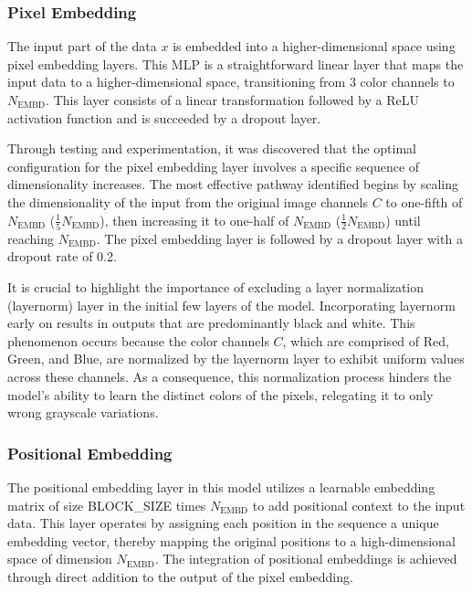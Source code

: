     \subsubsection{Pixel Embedding}

    The input part of the data \(x\) is embedded into a higher-dimensional space using pixel embedding layers. This MLP is a straightforward linear layer that maps the input data to a higher-dimensional space, transitioning from 3 color channels to \(N_{\text{EMBD}}\). This layer consists of a linear transformation followed by a ReLU activation function and is succeeded by a dropout layer.

    Through testing and experimentation, it was discovered that the optimal configuration for the pixel embedding layer involves a specific sequence of dimensionality increases. The most effective pathway identified begins by scaling the dimensionality of the input from the original image channels \(C\) to one-fifth of \(N_{\text{EMBD}}\) (\(\frac{1}{5}N_{\text{EMBD}}\)), then increasing it to one-half of \(N_{\text{EMBD}}\) (\(\frac{1}{2}N_{\text{EMBD}}\)) until reaching \(N_{\text{EMBD}}\). The pixel embedding layer is followed by a dropout layer with a dropout rate of 0.2.

    It is crucial to highlight the importance of excluding a layer normalization (layernorm) layer in the initial few layers of the model. Incorporating layernorm early on results in outputs that are predominantly black and white. This phenomenon occurs because the color channels \(C\), which are comprised of Red, Green, and Blue, are normalized by the layernorm layer to exhibit uniform values across these channels. As a consequence, this normalization process hinders the model's ability to learn the distinct colors of the pixels, relegating it to only wrong grayscale variations.

    \subsubsection{Positional Embedding}

    The positional embedding layer in this model utilizes a learnable embedding matrix of size BLOCK\_SIZE times \(N_{\text{EMBD}}\) to add positional context to the input data. This layer operates by assigning each position in the sequence a unique embedding vector, thereby mapping the original positions to a high-dimensional space of dimension \(N_{\text{EMBD}}\). The integration of positional embeddings is achieved through direct addition to the output of the pixel embedding.

